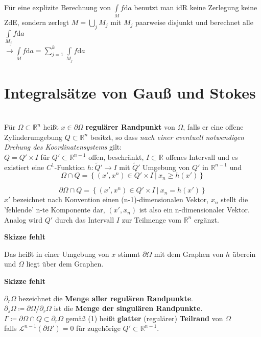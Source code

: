 Für eine explizite Berechnung von $\int\limits_M f \mathrm{d}a $
benutzt man idR keine Zerlegung keine ZdE, sondern zerlegt 
$M = \bigcup\limits_j M_j $ mit $M_j $ paarweise disjunkt und berechnet alle
$\int\limits_{M_j} f \mathrm{d}a $ \\
$\longrightarrow \int\limits_M f \mathrm{d}a 
= \sum\limits_{j=1}^k \int\limits_{M_j} f \mathrm{d}a $

\section{Integralsätze von Gauß und Stokes}

\begin{definition}
    \mbox{} \\
    Für $\Omega \subset \mathbb{R}^n $ heißt $x \in \partial \Omega $
    \textbf{regulärer Randpunkt} von $\Omega $, falls er eine offene Zylinderumgebung
    $Q \subset \mathbb{R}^n $ besitzt, so dass 
    \emph{nach einer eventuell notwendigen Drehung des Koordinatensystems} gilt:\\
    $Q = Q' \times I $ für $Q' \subset \mathbb{R}^{n-1} $ offen, beschränkt, 
    $I \subset \mathbb{R} $ offenes Intervall und es existiert eine $C^1 $-Funktion
    $h: \tilde{Q}' \rightarrow I $ mit $\tilde{Q}' $ Umgebung von $Q' $
    in $\mathbb{R}^{n-1} $ und \\
    \begin{equation*}
        \Omega \cap Q = 
        \left\lbrace \left(x', x^n \right) \in Q' \times I \ |\ x_n \geq h(x') 
        \right\rbrace
    \end{equation*}        
     
    \begin{equation}
        \partial\Omega \cap Q = 
        \left\lbrace \left(x', x^n \right) \in Q' \times I \ |\ x_n = h(x') \right\rbrace
    \end{equation}
    $x'$ bezeichnet nach Konvention einen (n-1)-dimensionalen Vektor, $x_n$ stellt die
    'fehlende' n-te Komponente dar, $(x', x_n) $ ist also ein n-dimensionaler Vektor.
    Analog wird $Q'$ durch das Intervall $I$ zur Teilmenge vom $\mathbb{R}^n $ ergänzt.
    
    \textbf{Skizze fehlt}    
    
    Das heißt in einer Umgebung von $x$ stimmt $\partial \Omega $ mit dem Graphen von $h$
    überein und $\Omega$ liegt über dem Graphen.
    
    \textbf{Skizze fehlt}
    
    $\partial_r \Omega $ bezeichnet die \textbf{Menge aller regulären Randpunkte}. \\
    $\partial_s \Omega \coloneqq \partial \Omega / \partial_r \Omega $ ist die 
    \textbf{Menge der singulären Randpunkte}. \\
    $\Gamma \coloneqq \partial \Omega \cap Q \subset \partial_r \Omega $
    gemäß (1) heißt \textbf{glatter} (regulärer) \textbf{Teilrand} von $\Omega$ \\
    falls $\mathcal{L}^{n-1} (\partial \Omega') = 0 $
    für zugehörige $Q' \subset \mathbb{R}^{n-1} $.
\end{definition}    
    
